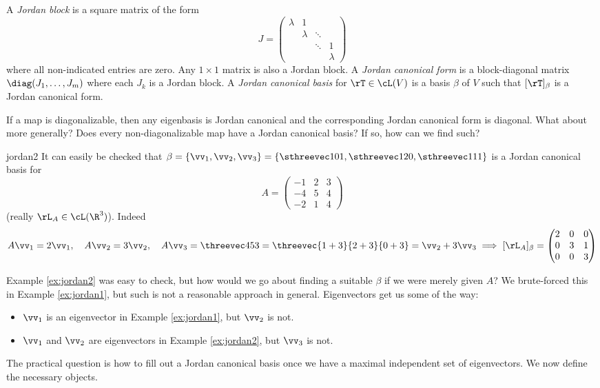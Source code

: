 \begin{defn}{}{}
A \emph{Jordan block} is a square matrix of the form
\[J=\begin{pmatrix}
\lambda&1&&\\[-2pt]
&\lambda&\ddots&\\[-2pt]
&&\ddots&1\\
&&&\lambda
\end{pmatrix}\]
where all non-indicated entries are zero. Any $1\times 1$ matrix is also a Jordan block.\smallbreak
A \emph{Jordan canonical form} is a block-diagonal matrix $\diag(J_1,\ldots,J_m)$ where each $J_k$ is a Jordan block.\smallbreak
A \emph{Jordan canonical basis} for $\rT\in\cL(V)$ is a basis $\beta$ of $V$ such that $[\rT]_\beta$ is a Jordan canonical form.
\end{defn}


If a map is diagonalizable, then any eigenbasis is Jordan canonical and the corresponding Jordan canonical form is diagonal. What about more generally? Does every non-diagonalizable map have a Jordan canonical basis? If so, how can we find such?

\goodbreak

\begin{example}{}{jordan2}
It can easily be checked that
$\beta=\{\vv_1,\vv_2,\vv_3\}=\left\{\sthreevec 101,\sthreevec 120,\sthreevec 111\right\}$
is a Jordan canonical basis for 
\[A=\begin{pmatrix}
-1&2&3\\-4&5&4\\-2&1&4
\end{pmatrix}\]
(really $\rL_A\in\cL(\R^3)$). Indeed
\[A\vv_1=2\vv_1,\quad A\vv_2=3\vv_2,\quad A\vv_3=\threevec 453=\threevec{1+3}{2+3}{0+3}=\vv_2+3\vv_3\implies [\rL_A]_\beta=\begin{pmatrix}
2&0&0\\
0&3&1\\
0&0&3
\end{pmatrix}\]
\end{example}


Example \ref{ex:jordan2} was easy to check, but how would we go about finding a suitable $\beta$ if we were merely given $A$? We brute-forced this in Example \ref{ex:jordan1}, but such is not a reasonable approach in general. Eigenvectors get us some of the way:
\begin{itemize}
  \item $\vv_1$ is an eigenvector in Example \ref{ex:jordan1}, but $\vv_2$ is not. 
  \item $\vv_1$ and $\vv_2$ are eigenvectors in Example \ref{ex:jordan2}, but $\vv_3$ is not.
\end{itemize}
The practical question is how to fill out a Jordan canonical basis once we have a maximal independent set of eigenvectors. We now define the necessary objects.

